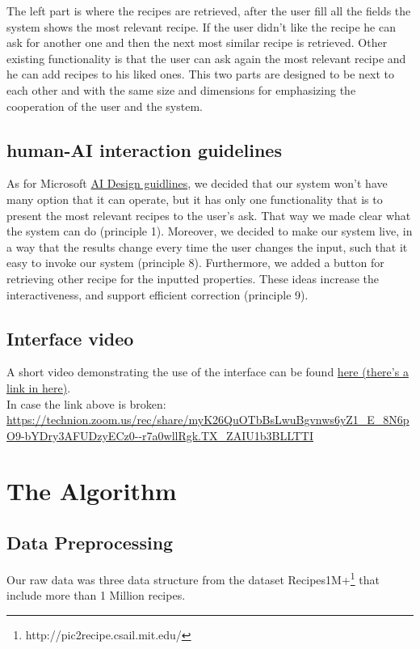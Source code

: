 \documentclass[]{article}
\begin{document}
The left part is where the recipes are retrieved, after the user fill all the fields the system shows the most relevant recipe. If the user didn't like the recipe he can ask for another one and then the next most similar recipe is retrieved. Other existing functionality is that the user can ask again the most relevant recipe and he can add recipes to his liked ones. This two parts are designed to be next to each other and with the same size and dimensions for emphasizing the cooperation of the user and the system.

\subsection{human-AI interaction guidelines}
As for Microsoft \href{https://www.microsoft.com/en-us/haxtoolkit/uploads/prod/2021/05/AI-Design-guidelines_041519.pdf}{AI Design guidlines}, we decided that our system won't have many option that it can operate, but it has only one functionality that is to present the most relevant recipes to the user's ask. That way we made clear what the system can do (principle 1). Moreover, we decided to make our system live, in a way that the results change every time the user changes the input, such that it easy to invoke our system (principle 8). Furthermore, we added a button for retrieving other recipe for the inputted properties. These ideas increase the interactiveness, and support efficient correction (principle 9). 

\subsection{Interface video}
A short video demonstrating the use of the interface can be found \href{https://technion.zoom.us/rec/share/myK26QuOTbBsLwuBgvnws6yZ1_E_8N6pO9-bYDry3AFUDzyECz0--r7a0wllRgk.TX_ZAIU1b3BLLTTI }{here (there's a link in here)}. \\
\linebreak
In case the link above is broken: \url{https://technion.zoom.us/rec/share/myK26QuOTbBsLwuBgvnws6yZ1_E_8N6pO9-bYDry3AFUDzyECz0--r7a0wllRgk.TX_ZAIU1b3BLLTTI }
\pagebreak

\section{The Algorithm}
\subsection{Data Preprocessing}
Our raw data was three data structure from the dataset Recipes1M+\footnote{http://pic2recipe.csail.mit.edu/} that include more than 1 Million recipes.
\end{document}
